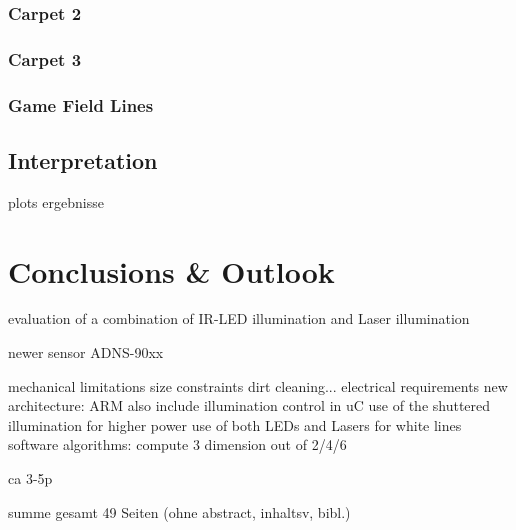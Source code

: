 \documentclass[12pt,a4paper]{article}
\begin{document}
\subsubsection{Carpet 2}

\subsubsection{Carpet 3}

\subsubsection{Game Field Lines}

\subsection{Interpretation}

  plots
  ergebnisse

\section{Conclusions \& Outlook}

  evaluation of a combination of IR-LED illumination and Laser illumination

  newer sensor ADNS-90xx

  mechanical limitations
    size constraints
    dirt cleaning...
  electrical requirements
    new architecture: ARM
    also include illumination control in uC
      use of the shuttered illumination for higher power 
      use of both LEDs and Lasers for white lines
  software algorithms: compute 3 dimension out of 2/4/6

ca 3-5p


summe gesamt 49 Seiten (ohne abstract, inhaltsv, bibl.)


\label{Bibliography}


%
\end{document}
